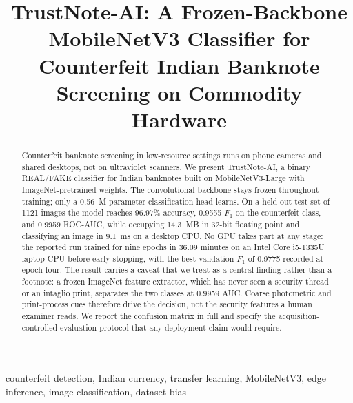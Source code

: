 \documentclass[conference]{IEEEtran}
\begin{document}
\title{TrustNote-AI: A Frozen-Backbone MobileNetV3 Classifier for\\
Counterfeit Indian Banknote Screening on Commodity Hardware}

\author{
\and
{}
}

\maketitle

\begin{abstract}
Counterfeit banknote screening in low-resource settings runs on phone cameras
and shared desktops, not on ultraviolet scanners. We present TrustNote-AI, a
binary REAL/FAKE classifier for Indian banknotes built on MobileNetV3-Large with
ImageNet-pretrained weights. The convolutional backbone stays frozen throughout
training; only a 0.56~M-parameter classification head learns. On a held-out test
set of 1121 images the model reaches 96.97\% accuracy, 0.9555 $F_1$ on the
counterfeit class, and 0.9959 ROC-AUC, while occupying 14.3~MB in 32-bit
floating point and classifying an image in 9.1~ms on a desktop CPU. No GPU takes
part at any stage: the reported run trained for nine epochs in 36.09 minutes on
an Intel Core i5-1335U laptop CPU before early stopping, with the best
validation $F_1$ of 0.9775 recorded at epoch four. The result carries a caveat
that we treat as a central finding rather than a footnote: a frozen ImageNet
feature extractor,
which has never seen a security thread or an intaglio print, separates the two
classes at 0.9959 AUC. Coarse photometric and print-process cues therefore drive
the decision, not the security features a human examiner reads. We report the
confusion matrix in full and specify the acquisition-controlled evaluation
protocol that any deployment claim would require.
\end{abstract}

\begin{IEEEkeywords}
counterfeit detection, Indian currency, transfer learning, MobileNetV3,
edge inference, image classification, dataset bias
\end{IEEEkeywords}
\end{document}
